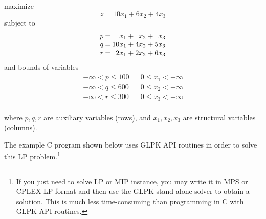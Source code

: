\noindent
\hspace{.5in} maximize
$$z = 10 x_1 + 6 x_2 + 4 x_3$$
\hspace{.5in} subject to
$$
\begin{array}{r@{\:}c@{\:}r@{\:}c@{\:}r@{\:}c@{\:}r}
p& = &x_1 &+&x_2 &+&x_3 \\
q& = &10 x_1 &+& 4 x_2 &+& 5 x_3 \\
r& = &2  x_1 &+& 2 x_2 &+& 6 x_3 \\
\end{array}
$$
\hspace{.5in} and bounds of variables
$$
\begin{array}{ccc}
\nonumber -\infty < p \leq 100 && 0 \leq x_1 < +\infty \\
\nonumber -\infty < q \leq 600 && 0 \leq x_2 < +\infty \\
\nonumber -\infty < r \leq 300 && 0 \leq x_3 < +\infty \\
\end{array}
$$

\medskip

where $p, q, r$ are auxiliary variables (rows), and $x_1, x_2, x_3$ are
structural variables (columns).

The example C program shown below uses GLPK API routines in order to
solve this LP problem.\footnote{If you just need to solve LP or MIP
instance, you may write it in MPS or CPLEX LP format and then use the
GLPK stand-alone solver to obtain a solution. This is much less
time-consuming than programming in C with GLPK API routines.}

